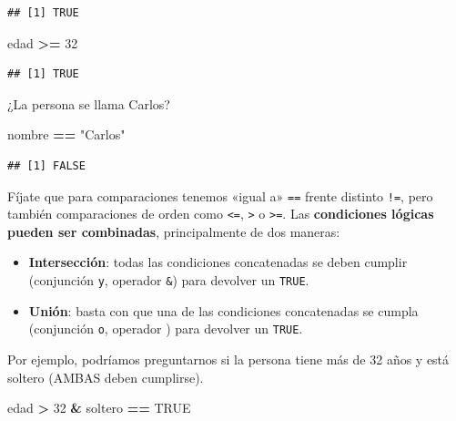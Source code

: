 \documentclass[11pt,]{book}
\newenvironment{Shaded}{\begin{snugshade}}{\end{snugshade}}
\newcommand{\DecValTok}[1]{\textcolor[rgb]{0.06,0.06,0.06}{#1}}
\newcommand{\NormalTok}[1]{#1}
\newcommand{\OperatorTok}[1]{\textcolor[rgb]{0.43,0.43,0.43}{\textbf{#1}}}
\newcommand{\OtherTok}[1]{\textcolor[rgb]{0.37,0.37,0.37}{#1}}
\newcommand{\StringTok}[1]{\textcolor[rgb]{0.5,0.5,0.5}{#1}}
\begin{document}
\begin{verbatim}
## [1] TRUE
\end{verbatim}

\begin{Shaded}
\begin{Highlighting}[]
\NormalTok{edad }\OperatorTok{>=}\StringTok{ }\DecValTok{32}
\end{Highlighting}
\end{Shaded}

\begin{verbatim}
## [1] TRUE
\end{verbatim}

¿La persona se llama Carlos?

\begin{Shaded}
\begin{Highlighting}[]
\NormalTok{nombre }\OperatorTok{==}\StringTok{ "Carlos"}
\end{Highlighting}
\end{Shaded}

\begin{verbatim}
## [1] FALSE
\end{verbatim}

Fíjate que para comparaciones tenemos «igual a» \texttt{==} frente distinto \texttt{!=}, pero también comparaciones de orden como \texttt{\textless{}=}, \texttt{\textgreater{}} o \texttt{\textgreater{}=}. Las \textbf{condiciones lógicas pueden ser combinadas}, principalmente de dos maneras:

\begin{itemize}
\item
  \textbf{Intersección}: todas las condiciones concatenadas se deben cumplir (conjunción \texttt{y}, operador \texttt{\&}) para devolver un \texttt{TRUE}.
\item
  \textbf{Unión}: basta con que una de las condiciones concatenadas se cumpla (conjunción \texttt{o}, operador \texttt{\textbar{}}) para devolver un \texttt{TRUE}.
\end{itemize}

Por ejemplo, podríamos preguntarnos si la persona tiene más de 32 años y está soltero (AMBAS deben cumplirse).

\begin{Shaded}
\begin{Highlighting}[]
\NormalTok{edad }\OperatorTok{>}\StringTok{ }\DecValTok{32} \OperatorTok{&}\StringTok{ }\NormalTok{soltero }\OperatorTok{==}\StringTok{ }\OtherTok{TRUE}
\end{Highlighting}
\end{Shaded}
\end{document}
